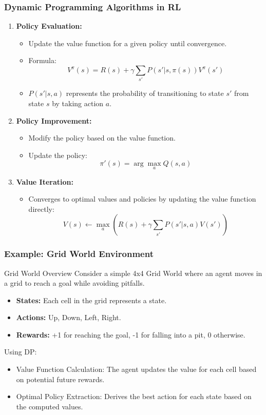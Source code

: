 \documentclass[aspectratio=169]{beamer}
\begin{document}
\begin{frame}[fragile]
  \frametitle{Dynamic Programming Algorithms in RL}
  \begin{enumerate}
    \item \textbf{Policy Evaluation:}
      \begin{itemize}
        \item Update the value function for a given policy until convergence.
        \item Formula:
          \[
          V^{\pi}(s) = R(s) + \gamma \sum_{s'} P(s' | s, \pi(s)) V^{\pi}(s')
          \]
        \item \(P(s' | s, a)\) represents the probability of transitioning to state \(s'\) from state \(s\) by taking action \(a\).
      \end{itemize}

    \item \textbf{Policy Improvement:}
      \begin{itemize}
        \item Modify the policy based on the value function.
        \item Update the policy:
          \[
          \pi'(s) = \arg\max_a Q(s, a)
          \]
      \end{itemize}

    \item \textbf{Value Iteration:}
      \begin{itemize}
        \item Converges to optimal values and policies by updating the value function directly:
          \[
          V(s) \leftarrow \max_a \left(R(s) + \gamma \sum_{s'} P(s' | s, a) V(s')\right)
          \]
      \end{itemize}
  \end{enumerate}
\end{frame}

\begin{frame}[fragile]
  \frametitle{Example: Grid World Environment}
  \begin{block}{Grid World Overview}
  Consider a simple 4x4 Grid World where an agent moves in a grid to reach a goal while avoiding pitfalls.
  \end{block}
  
  \begin{itemize}
    \item \textbf{States:} Each cell in the grid represents a state.
    \item \textbf{Actions:} Up, Down, Left, Right.
    \item \textbf{Rewards:} +1 for reaching the goal, -1 for falling into a pit, 0 otherwise.
  \end{itemize}
  
  Using DP:
  \begin{itemize}
    \item Value Function Calculation: The agent updates the value for each cell based on potential future rewards.
    \item Optimal Policy Extraction: Derives the best action for each state based on the computed values.
  \end{itemize}
\end{frame}
\end{document}
